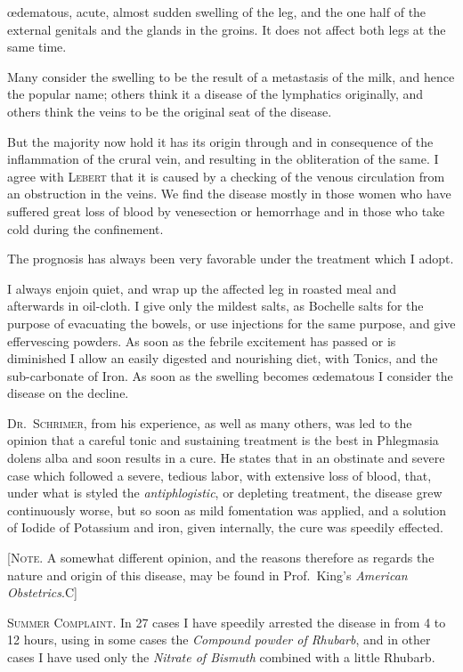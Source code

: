 œdematous, acute, almost sudden swelling of the leg, and the one half
of the external genitals and the glands in the groins. It does not
affect both legs at the same time.

Many consider the swelling to be the result of a metastasis of the
milk, and hence the popular name; others think it a disease of the
lymphatics originally, and others think the veins to be the original
seat of the disease.

But the majority now hold it has its origin through and in consequence
of the inflammation of the crural vein, and resulting in the
obliteration of the same. I agree with \textsc{Lebert} that it is caused by a
checking of the venous circulation from an obstruction in the veins.
We find the disease mostly in those women who have suffered great
loss of blood by venesection or hemorrhage and in those who take cold
during the confinement.

The prognosis has always been very favorable under the treatment
which I adopt.

I always enjoin quiet, and wrap up the affected leg in roasted meal
and afterwards in oil-cloth. I give only the mildest salts, as Bochelle
salts for the purpose of evacuating the bowels, or use injections for
the same purpose, and give effervescing powders. As soon as the
febrile excitement has passed or is diminished I allow an easily digested
and nourishing diet, with Tonics, and the sub-carbonate of Iron. As
soon as the swelling becomes œdematous I consider the disease on the
decline.

\textsc{Dr.\ Schrimer}, from his experience, as well as many others, was led
to the opinion that a careful tonic and sustaining treatment is the best
in Phlegmasia dolens alba and soon results in a cure. He states that
in an obstinate and severe case which followed a severe, tedious labor,
with extensive loss of blood, that, under what is styled the \emph{antiphlogistic},
or depleting treatment, the disease grew continuously worse, but
so soon as mild fomentation was applied, and a solution of Iodide of
Potassium and iron, given internally, the cure was speedily effected.

[\textsc{Note}. A somewhat different opinion, and the reasons therefore as
regards the nature and origin of this disease, may be found in Prof.\ King's
\emph{American Obstetrics}.\hfill{}C]

\textsc{Summer Complaint}. In 27 cases I have speedily arrested the disease
in from 4 to 12 hours, using in some cases the \emph{Compound powder
of Rhubarb}, and in other cases I have used only the \emph{Nitrate of Bismuth}
combined with a little Rhubarb.\endinput

